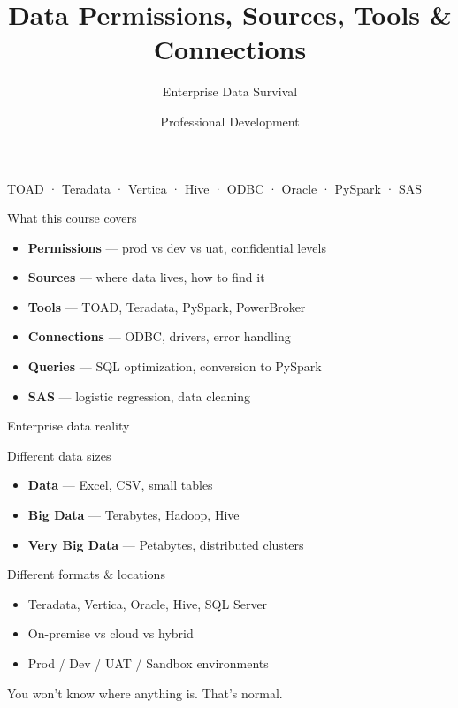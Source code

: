 \documentclass[aspectratio=169, 11pt]{beamer}
\title{\textbf{Data Permissions, Sources, Tools \& Connections}}
\subtitle{Enterprise Data Survival}
\author{Professional Development}
\date{}
\begin{document}
	
	\begin{frame}
		\titlepage
		\centering
		\tiny{TOAD · Teradata · Vertica · Hive · ODBC · Oracle · PySpark · SAS}
	\end{frame}
	
	\begin{frame}{What this course covers}
		\tiny
		\begin{itemize}
			\item \textbf{Permissions} — prod vs dev vs uat, confidential levels
			\item \textbf{Sources} — where data lives, how to find it
			\item \textbf{Tools} — TOAD, Teradata, PySpark, PowerBroker
			\item \textbf{Connections} — ODBC, drivers, error handling
			\item \textbf{Queries} — SQL optimization, conversion to PySpark
			\item \textbf{SAS} — logistic regression, data cleaning
		\end{itemize}
	\end{frame}
	
	\begin{frame}{Enterprise data reality}
		\begin{block}{Different data sizes}
			\tiny
			\begin{itemize}
				\item \textbf{Data} — Excel, CSV, small tables
				\item \textbf{Big Data} — Terabytes, Hadoop, Hive
				\item \textbf{Very Big Data} — Petabytes, distributed clusters
			\end{itemize}
		\end{block}
		\vspace{0.03cm}
		\begin{block}{Different formats \& locations}
			\tiny
			\begin{itemize}
				\item Teradata, Vertica, Oracle, Hive, SQL Server
				\item On-premise vs cloud vs hybrid
				\item Prod / Dev / UAT / Sandbox environments
			\end{itemize}
		\end{block}
		\tiny\alert{You won't know where anything is. That's normal.}
	\end{frame}
	
\end{document}
